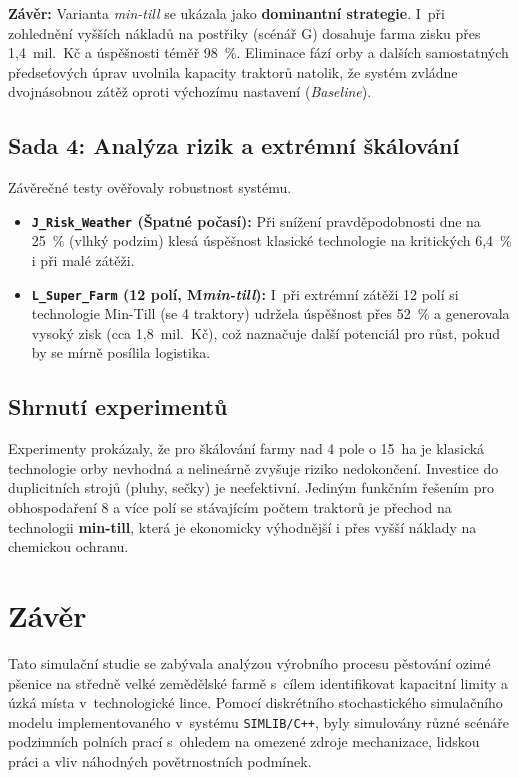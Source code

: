 \documentclass[11pt,a4paper]{article}
\begin{document}
\textbf{Závěr:} Varianta \emph{min-till} se ukázala jako \textbf{dominantní strategie}. I~při zohlednění vyšších nákladů na postřiky (scénář G) dosahuje farma zisku přes 1,4~mil.~Kč a úspěšnosti téměř 98~\%. Eliminace fází orby a dalších samostatných předseťových úprav uvolnila kapacity traktorů natolik, že systém zvládne dvojnásobnou zátěž oproti výchozímu nastavení (\emph{Baseline}).

\subsection{Sada 4: Analýza rizik a extrémní škálování}

Závěrečné testy ověřovaly robustnost systému.

\begin{itemize}
    \item \textbf{\texttt{J\_Risk\_Weather} (Špatné počasí):} Při snížení pravděpodobnosti  dne na 25~\% (vlhký podzim) klesá úspěšnost klasické technologie na kritických 6,4~\% i při malé zátěži.
    \item \textbf{\texttt{L\_Super\_Farm} (12 polí, M\emph{min-till}):} I~při extrémní zátěži 12 polí si technologie Min-Till (se 4 traktory) udržela úspěšnost přes 52~\% a generovala vysoký zisk (cca 1,8~mil.~Kč), což naznačuje další potenciál pro růst, pokud by se mírně posílila logistika.
\end{itemize}

\subsection{Shrnutí experimentů}

Experimenty prokázaly, že pro škálování farmy nad 4 pole o 15~ha je klasická technologie orby nevhodná a nelineárně zvyšuje riziko nedokončení. Investice do duplicitních strojů (pluhy, sečky) je neefektivní. Jediným funkčním řešením pro obhospodaření 8 a více polí se stávajícím počtem traktorů je přechod na technologii \textbf{min-till}, která je ekonomicky výhodnější i přes vyšší náklady na chemickou ochranu.

\section{Závěr}

Tato simulační studie se zabývala analýzou výrobního procesu pěstování ozimé pšenice na středně velké zemědělské farmě s~cílem identifikovat kapacitní limity a úzká místa v~technologické lince. Pomocí diskrétního stochastického simulačního modelu implementovaného v~systému \texttt{SIMLIB/C++}, byly simulovány různé scénáře podzimních polních prací s~ohledem na omezené zdroje mechanizace, lidskou práci a vliv náhodných povětrnostních podmínek.
\end{document}
